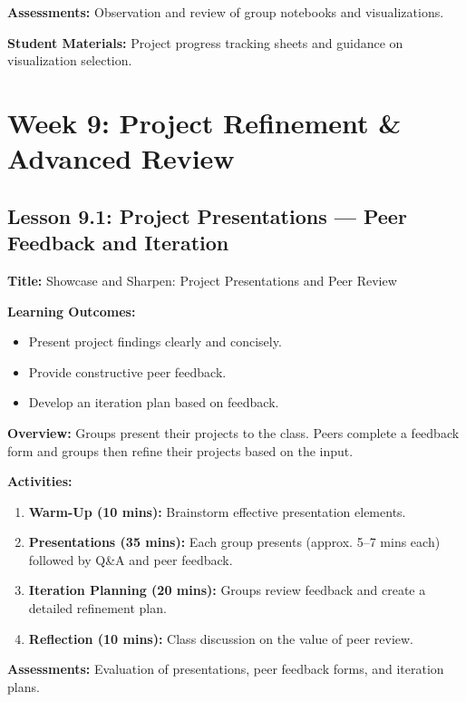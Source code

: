 \documentclass{tufte-book}
\begin{document}
\medskip
\textbf{Assessments:}  
Observation and review of group notebooks and visualizations.

\medskip
\textbf{Student Materials:}  
Project progress tracking sheets and guidance on visualization selection.

\section{Week 9: Project Refinement \& Advanced Review}

\subsection{Lesson 9.1: Project Presentations --- Peer Feedback and Iteration}
\textbf{Title:} Showcase and Sharpen: Project Presentations and Peer Review

\medskip
\textbf{Learning Outcomes:}
\begin{itemize}[leftmargin=*, label={\textbullet}]
    \item Present project findings clearly and concisely.
    \item Provide constructive peer feedback.
    \item Develop an iteration plan based on feedback.
\end{itemize}

\medskip
\textbf{Overview:}  
Groups present their projects to the class. Peers complete a feedback form and groups then refine their projects based on the input.

\medskip
\textbf{Activities:}
\begin{enumerate}[label=\arabic*.]
    \item \textbf{Warm-Up (10 mins):} Brainstorm effective presentation elements.
    \item \textbf{Presentations (35 mins):} Each group presents (approx. 5--7 mins each) followed by Q\&A and peer feedback.
    \item \textbf{Iteration Planning (20 mins):} Groups review feedback and create a detailed refinement plan.
    \item \textbf{Reflection (10 mins):} Class discussion on the value of peer review.
\end{enumerate}

\medskip
\textbf{Assessments:}  
Evaluation of presentations, peer feedback forms, and iteration plans.
\end{document}
